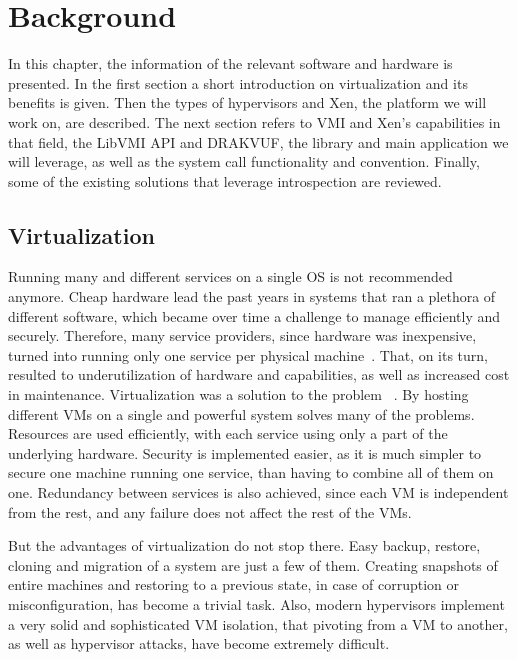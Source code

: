 
\chapter{Background}\label{ch:background}

In this chapter, the information of the relevant software and hardware is presented. In the first section a short introduction on virtualization and its benefits is given. Then the types of hypervisors and Xen, the platform we will work on, are described. The next section refers to \ac{VMI} and Xen's capabilities in that field, the LibVMI \ac{API} and DRAKVUF, the library and main application we will leverage, as well as the system call functionality and convention. Finally, some of the existing solutions that leverage introspection are reviewed.

\section{Virtualization}\label{sec:virtualization}
Running many and different services on a single \ac{OS} is not recommended anymore. Cheap hardware lead the past years in systems that ran a plethora of different software, which became over time a challenge to manage efficiently and securely. Therefore, many service providers, since hardware was inexpensive, turned into running only one service per physical machine~\cite{rosenblum2005virtual}. That, on its turn, resulted to underutilization of hardware and capabilities, as well as increased cost in maintenance. Virtualization was a solution to the problem ~\cite{rosenblum2005virtual}. By hosting different \ac{VM}s on a single and powerful system solves many of the problems. Resources are used efficiently, with each service using only a part of the underlying hardware. Security is implemented easier, as it is much simpler to secure one machine running one service, than having to combine all of them on one. Redundancy between services is also achieved, since each \ac{VM} is independent from the rest, and any failure does not affect the rest of the \ac{VM}s.
\par But the advantages of virtualization do not stop there. Easy backup, restore, cloning and migration of a system are just a few of them. Creating snapshots of entire machines and restoring to a previous state, in case of corruption or misconfiguration, has become a trivial task. Also, modern hypervisors implement a very solid and sophisticated \ac{VM} isolation, that pivoting from a \ac{VM} to another, as well as hypervisor attacks, have become extremely difficult.

